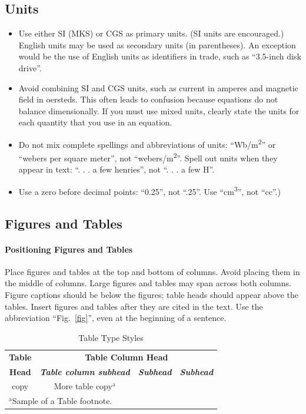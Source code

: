 \documentclass[conference]{IEEEtran}
\begin{document}
    \subsection{Units}
    \begin{itemize}
        \item Use either SI (MKS) or CGS as primary units. (SI units are encouraged.) English units may be used as secondary units (in parentheses). An exception would be the use of English units as identifiers in trade, such as ``3.5-inch disk drive''.
        \item Avoid combining SI and CGS units, such as current in amperes and magnetic field in oersteds. This often leads to confusion because equations do not balance dimensionally. If you must use mixed units, clearly state the units for each quantity that you use in an equation.
        \item Do not mix complete spellings and abbreviations of units: ``Wb/m\textsuperscript{2}'' or ``webers per square meter'', not ``webers/m\textsuperscript{2}''. Spell out units when they appear in text: ``. . . a few henries'', not ``. . . a few H''.
        \item Use a zero before decimal points: ``0.25'', not ``.25''. Use ``cm\textsuperscript{3}'', not ``cc''.)
    \end{itemize}

    

    \subsection{Figures and Tables}
    \paragraph{Positioning Figures and Tables} Place figures and tables at the top and
    bottom of columns. Avoid placing them in the middle of columns. Large
    figures and tables may span across both columns. Figure captions should be
    below the figures; table heads should appear above the tables. Insert
    figures and tables after they are cited in the text. Use the abbreviation
    ``Fig.~\ref{fig}'', even at the beginning of a sentence.

    \begin{table}[htbp]
        \caption{Table Type Styles}
        \begin{center}
            \begin{tabular}{|c|c|c|c|}
                \hline
                \textbf{Table}&\multicolumn{3}{|c|}{\textbf{Table Column Head}} \\
                \cline{2-4}
                \textbf{Head} & \textbf{\textit{Table column subhead}}& \textbf{\textit{Subhead}}& \textbf{\textit{Subhead}} \\
                \hline
                copy& More table copy$^{\mathrm{a}}$& &  \\
                \hline
                \multicolumn{4}{l}{$^{\mathrm{a}}$Sample of a Table footnote.}
            \end{tabular}
            \label{tab1}
        \end{center}
    \end{table}
\end{document}
